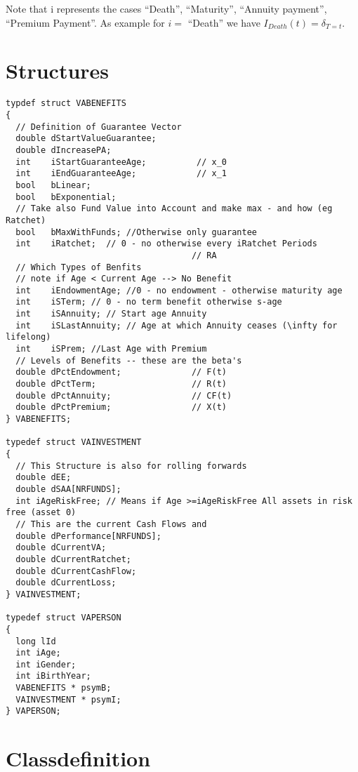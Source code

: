 \documentclass[10pt, a4paper,landscape]{article}
\begin{document}
Note that i represents the cases ``Death'', ``Maturity'', ``Annuity payment'', ``Premium Payment''. As example for $i=$ ``Death'' we have $I_{Death}(t) =\delta_{T=t}$.





\section{Structures}
\begin{verbatim}
typdef struct VABENEFITS
{
  // Definition of Guarantee Vector
  double dStartValueGuarantee; 
  double dIncreasePA;
  int    iStartGuaranteeAge;          // x_0
  int    iEndGuaranteeAge;            // x_1
  bool   bLinear;
  bool   bExponential;
  // Take also Fund Value into Account and make max - and how (eg Ratchet)
  bool   bMaxWithFunds; //Otherwise only guarantee
  int    iRatchet;  // 0 - no otherwise every iRatchet Periods
                                     // RA
  // Which Types of Benfits
  // note if Age < Current Age --> No Benefit
  int    iEndowmentAge; //0 - no endowment - otherwise maturity age
  int    iSTerm; // 0 - no term benefit otherwise s-age
  int    iSAnnuity; // Start age Annuity
  int    iSLastAnnuity; // Age at which Annuity ceases (\infty for lifelong)
  int    iSPrem; //Last Age with Premium 
  // Levels of Benefits -- these are the beta's
  double dPctEndowment;              // F(t)
  double dPctTerm;                   // R(t)
  double dPctAnnuity;                // CF(t)
  double dPctPremium;                // X(t)
} VABENEFITS;

typedef struct VAINVESTMENT
{
  // This Structure is also for rolling forwards
  double dEE;
  double dSAA[NRFUNDS];
  int iAgeRiskFree; // Means if Age >=iAgeRiskFree All assets in risk free (asset 0) 
  // This are the current Cash Flows and 
  double dPerformance[NRFUNDS];
  double dCurrentVA;
  double dCurrentRatchet;
  double dCurrentCashFlow;
  double dCurrentLoss;
} VAINVESTMENT;

typedef struct VAPERSON
{
  long lId
  int iAge;
  int iGender;
  int iBirthYear;
  VABENEFITS * psymB;
  VAINVESTMENT * psymI; 
} VAPERSON;
\end{verbatim}

\section{Classdefinition}
\end{document}
